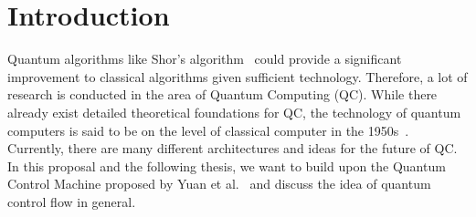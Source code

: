 \chapter{Introduction}

Quantum algorithms like Shor's algorithm~\cite{Shor97} could provide a significant improvement to classical algorithms given sufficient technology. Therefore, a lot of research is conducted in the area of Quantum Computing (QC). While there already exist detailed theoretical foundations for QC, the technology of quantum computers is said to be on the level of classical computer in the 1950s~\cite{CFM17}. Currently, there are many different architectures and ideas for the future of QC. In this proposal and the following thesis, we want to build upon the Quantum Control Machine proposed by Yuan et al.~\cite{YVC24} and discuss the idea of quantum control flow  in general.


